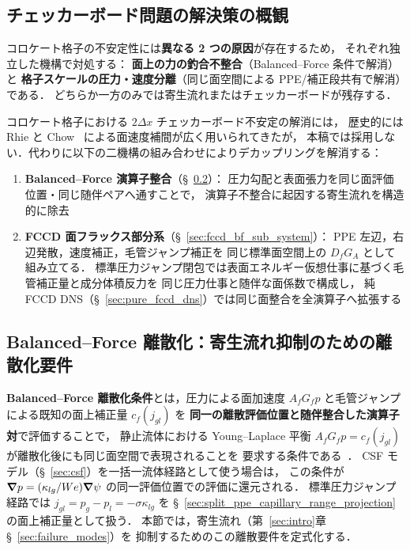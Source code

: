 \subsection{チェッカーボード問題の解決策の概観}
\label{sec:checkerboard_solution}

コロケート格子の不安定性には\textbf{異なる 2 つの原因}が存在するため，
それぞれ独立した機構で対処する：
\textbf{面上の力の釣合不整合}（Balanced--Force 条件で解消）と
\textbf{格子スケールの圧力・速度分離}（同じ面空間による PPE/補正段共有で解消）である．
どちらか一方のみでは寄生流れまたはチェッカーボードが残存する．

コロケート格子における $2\Delta x$ チェッカーボード不安定の解消には，
歴史的には Rhie と Chow~\cite{RhieChow1983} による面速度補間が広く用いられてきたが，
本稿では採用しない．代わりに以下の二機構の組み合わせによりデカップリングを解消する：
\begin{enumerate}[noitemsep]
  \item \textbf{Balanced--Force 演算子整合}（§~\ref{sec:balanced_force}）：
        圧力勾配と表面張力を同じ面評価位置・同じ随伴ペアへ通すことで，
        演算子不整合に起因する寄生流れを構造的に除去
  \item \textbf{FCCD 面フラックス部分系}（§~\ref{sec:fccd_bf_sub_system}）：
        PPE 左辺，右辺発散，速度補正，毛管ジャンプ補正を
        同じ標準面空間上の $D_fG_A$ として組み立てる．
        標準圧力ジャンプ閉包では表面エネルギー仮想仕事に基づく毛管補正量と成分体積反力を
        同じ圧力仕事と随伴な面係数で構成し，
        純 FCCD DNS（§~\ref{sec:pure_fccd_dns}）では同じ面整合を全演算子へ拡張する
\end{enumerate}

\subsection{Balanced--Force 離散化：寄生流れ抑制のための離散化要件}
\label{sec:balanced_force}

\textbf{Balanced--Force 離散化条件}とは，圧力による面加速度
$A_f G_f p$ と毛管ジャンプによる既知の面上補正量 $c_f(j_{gl})$ を
\textbf{同一の離散評価位置と随伴整合した演算子対}で評価することで，
静止流体における Young--Laplace 平衡
$A_f G_f p=c_f(j_{gl})$ が離散化後にも同じ面空間で表現されることを
要求する条件である~\cite{Francois2006}．
CSF モデル（§~\ref{sec:csf}）を一括一流体経路として使う場合は，
この条件が $\bm{\nabla} p=(\kappa_{lg}/We)\bm{\nabla}\psi$ の同一評価位置での評価に還元される．
標準圧力ジャンプ経路では $j_{gl}=p_g-p_l=-\sigma\kappa_{lg}$ を
§~\ref{sec:split_ppe_capillary_range_projection} の面上補正量として扱う．
本節では，寄生流れ（第~\ref{sec:intro}章§~\ref{sec:failure_modes}）を
抑制するためのこの離散要件を定式化する．

